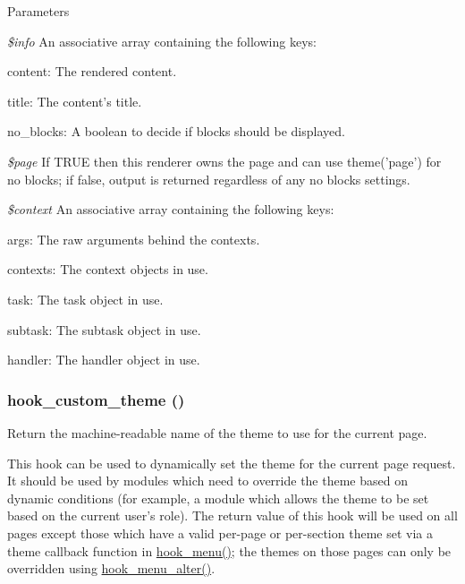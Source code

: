 \begin{DoxyParams}{Parameters}
\item[{\em \$info}]An associative array containing the following keys:
\begin{DoxyItemize}
\item content: The rendered content.
\item title: The content's title.
\item no\_\-blocks: A boolean to decide if blocks should be displayed. 
\end{DoxyItemize}\item[{\em \$page}]If TRUE then this renderer owns the page and can use theme('page') for no blocks; if false, output is returned regardless of any no blocks settings. \item[{\em \$context}]An associative array containing the following keys:
\begin{DoxyItemize}
\item args: The raw arguments behind the contexts.
\item contexts: The context objects in use.
\item task: The task object in use.
\item subtask: The subtask object in use.
\item handler: The handler object in use. 
\end{DoxyItemize}\end{DoxyParams}
\hypertarget{group__hooks_gab83dce4ef80bc5005ee0de98fc005b1f}{
\subsubsection[{hook\_\-custom\_\-theme}]{\setlength{\rightskip}{0pt plus 5cm}hook\_\-custom\_\-theme ()}}
\label{group__hooks_gab83dce4ef80bc5005ee0de98fc005b1f}
Return the machine-\/readable name of the theme to use for the current page.

This hook can be used to dynamically set the theme for the current page request. It should be used by modules which need to override the theme based on dynamic conditions (for example, a module which allows the theme to be set based on the current user's role). The return value of this hook will be used on all pages except those which have a valid per-\/page or per-\/section theme set via a theme callback function in \hyperlink{group__hooks_ga5c95244fea59b25666e409759e133ded}{hook\_\-menu()}; the themes on those pages can only be overridden using \hyperlink{group__hooks_ga4c37deddcf48dbfe6f3081df1652f6fa}{hook\_\-menu\_\-alter()}.

